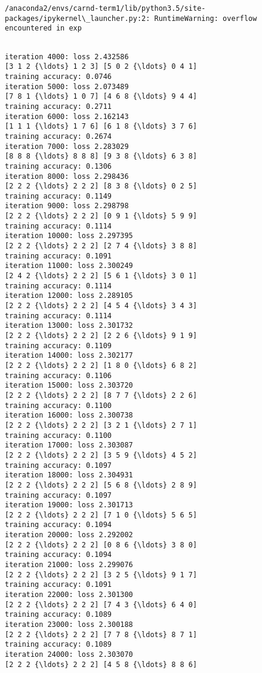 \documentclass[11pt]{article}
\begin{document}
    \begin{Verbatim}[commandchars=\\\{\}]
/anaconda2/envs/carnd-term1/lib/python3.5/site-packages/ipykernel\_launcher.py:2: RuntimeWarning: overflow encountered in exp
  

    \end{Verbatim}

    \begin{Verbatim}[commandchars=\\\{\}]
iteration 4000: loss 2.432586
[3 1 2 {\ldots} 1 2 3] [5 0 2 {\ldots} 0 4 1]
training accuracy: 0.0746
iteration 5000: loss 2.073489
[7 8 1 {\ldots} 1 0 7] [4 6 8 {\ldots} 9 4 4]
training accuracy: 0.2711
iteration 6000: loss 2.162143
[1 1 1 {\ldots} 1 7 6] [6 1 8 {\ldots} 3 7 6]
training accuracy: 0.2674
iteration 7000: loss 2.283029
[8 8 8 {\ldots} 8 8 8] [9 3 8 {\ldots} 6 3 8]
training accuracy: 0.1306
iteration 8000: loss 2.298436
[2 2 2 {\ldots} 2 2 2] [8 3 8 {\ldots} 0 2 5]
training accuracy: 0.1149
iteration 9000: loss 2.298798
[2 2 2 {\ldots} 2 2 2] [0 9 1 {\ldots} 5 9 9]
training accuracy: 0.1114
iteration 10000: loss 2.297395
[2 2 2 {\ldots} 2 2 2] [2 7 4 {\ldots} 3 8 8]
training accuracy: 0.1091
iteration 11000: loss 2.300249
[2 4 2 {\ldots} 2 2 2] [5 6 1 {\ldots} 3 0 1]
training accuracy: 0.1114
iteration 12000: loss 2.289105
[2 2 2 {\ldots} 2 2 2] [4 5 4 {\ldots} 3 4 3]
training accuracy: 0.1114
iteration 13000: loss 2.301732
[2 2 2 {\ldots} 2 2 2] [2 2 6 {\ldots} 9 1 9]
training accuracy: 0.1109
iteration 14000: loss 2.302177
[2 2 2 {\ldots} 2 2 2] [1 8 0 {\ldots} 6 8 2]
training accuracy: 0.1106
iteration 15000: loss 2.303720
[2 2 2 {\ldots} 2 2 2] [8 7 7 {\ldots} 2 2 6]
training accuracy: 0.1100
iteration 16000: loss 2.300738
[2 2 2 {\ldots} 2 2 2] [3 2 1 {\ldots} 2 7 1]
training accuracy: 0.1100
iteration 17000: loss 2.303087
[2 2 2 {\ldots} 2 2 2] [3 5 9 {\ldots} 4 5 2]
training accuracy: 0.1097
iteration 18000: loss 2.304931
[2 2 2 {\ldots} 2 2 2] [5 6 8 {\ldots} 2 8 9]
training accuracy: 0.1097
iteration 19000: loss 2.301713
[2 2 2 {\ldots} 2 2 2] [7 1 0 {\ldots} 5 6 5]
training accuracy: 0.1094
iteration 20000: loss 2.292002
[2 2 2 {\ldots} 2 2 2] [0 8 6 {\ldots} 3 8 0]
training accuracy: 0.1094
iteration 21000: loss 2.299076
[2 2 2 {\ldots} 2 2 2] [3 2 5 {\ldots} 9 1 7]
training accuracy: 0.1091
iteration 22000: loss 2.301300
[2 2 2 {\ldots} 2 2 2] [7 4 3 {\ldots} 6 4 0]
training accuracy: 0.1089
iteration 23000: loss 2.300188
[2 2 2 {\ldots} 2 2 2] [7 7 8 {\ldots} 8 7 1]
training accuracy: 0.1089
iteration 24000: loss 2.303070
[2 2 2 {\ldots} 2 2 2] [4 5 8 {\ldots} 8 8 6]

\end{Verbatim}
\end{document}
